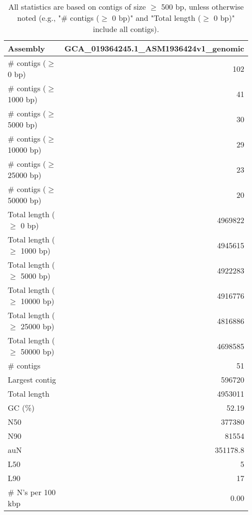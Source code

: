 \documentclass[12pt,a4paper]{article}
\begin{document}
\begin{table}[ht]
\begin{center}
\caption{All statistics are based on contigs of size $\geq$ 500 bp, unless otherwise noted (e.g., "\# contigs ($\geq$ 0 bp)" and "Total length ($\geq$ 0 bp)" include all contigs).}
\begin{tabular}{|l*{1}{|r}|}
\hline
Assembly & GCA\_019364245.1\_ASM1936424v1\_genomic \\ \hline
\# contigs ($\geq$ 0 bp) & 102 \\ \hline
\# contigs ($\geq$ 1000 bp) & 41 \\ \hline
\# contigs ($\geq$ 5000 bp) & 30 \\ \hline
\# contigs ($\geq$ 10000 bp) & 29 \\ \hline
\# contigs ($\geq$ 25000 bp) & 23 \\ \hline
\# contigs ($\geq$ 50000 bp) & 20 \\ \hline
Total length ($\geq$ 0 bp) & 4969822 \\ \hline
Total length ($\geq$ 1000 bp) & 4945615 \\ \hline
Total length ($\geq$ 5000 bp) & 4922283 \\ \hline
Total length ($\geq$ 10000 bp) & 4916776 \\ \hline
Total length ($\geq$ 25000 bp) & 4816886 \\ \hline
Total length ($\geq$ 50000 bp) & 4698585 \\ \hline
\# contigs & 51 \\ \hline
Largest contig & 596720 \\ \hline
Total length & 4953011 \\ \hline
GC (\%) & 52.19 \\ \hline
N50 & 377380 \\ \hline
N90 & 81554 \\ \hline
auN & 351178.8 \\ \hline
L50 & 5 \\ \hline
L90 & 17 \\ \hline
\# N's per 100 kbp & 0.00 \\ \hline
\end{tabular}
\end{center}
\end{table}
\end{document}
